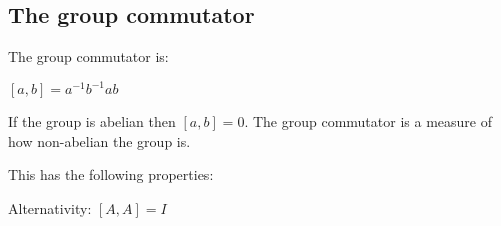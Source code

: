 
\subsection{The group commutator}

The group commutator is:

\([a,b]=a^{-1}b^{-1}ab\)

If the group is abelian then \([a,b]=0\). The group commutator is a measure of how non-abelian the group is.

This has the following properties:

\begin{itemize}
\list Alternativity: \([A,A]=I\)
\end{itemize}

